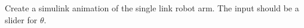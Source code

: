 Create a simulink animation of the single link robot arm. The input should be a slider for $\theta$.
